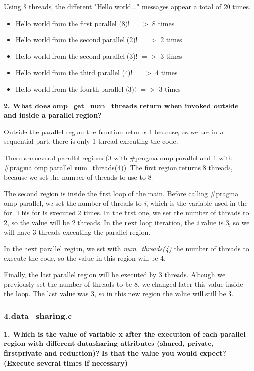 \documentclass[12pt, a4paper]{article}
\begin{document}
Using 8 threads, the different "Hello world..." messages appear a total of 20 times.

\begin{itemize}
	\item Hello world from the first parallel (8)! $=>$ 8 times
	\item Hello world from the second parallel (2)! $=>$ 2 times
	\item Hello world from the second parallel (3)! $=>$ 3 times
	\item Hello world from the third parallel (4)! $=>$ 4 times
	\item Hello world from the fourth  parallel (3)! $=>$ 3 times
\end{itemize}

\hfill

\textbf{2. What does omp\_get\_num\_threads return when invoked outside and inside a parallel region?}

Outside the parallel region the function returns 1 because, as we are in a sequential part, there is only 1 thread executing the code.

There are several parallel regions (3 with \#pragma omp parallel and 1 with \#pragma omp parallel num\_threads(4)). The first region returns 8 threads, because we set the number of threads to use to 8.

The second region is inside the first loop of the main. Before calling \#pragma omp parallel, we set the number of threads to \textit{i}, which is the variable used in the for. This for is executed 2 times. In the first one, we set the number of threads to 2, so the value will be 2 threads. In the next loop iteration, the \textit{i} value is 3, so we will have 3 threads executing the parallel region.

In the next parallel region, we set with \textit{num\_threads(4)} the number of threads to execute the code, so the value in this region will be 4.

Finally, the last parallel region will be executed by 3 threads. Altough we previously set the number of threads to be 8, we changed later this value inside the loop. The last value was 3, so in this new region the value will still be 3.

\subsubsection{4.data\_sharing.c}

\textbf{1. Which is the value of variable x after the execution of each parallel region with different datasharing attributes (shared, private, firstprivate and reduction)? Is that the value you would expect? (Execute several times if necessary)}
\end{document}
